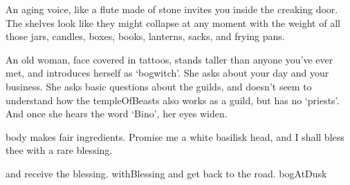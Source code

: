 An aging voice, like a flute made of stone invites you inside the creaking door.
The shelves look like they might collapse at any moment with the weight of all those jars, candles, boxes, books, lanterns, sacks, and frying pans.

An old woman, face covered in tattoos, stands taller than anyone you've ever met, and introduces herself as `\gls{bogwitch}'.
She asks about your day and your business.
She asks basic questions about the guilds, and doesn't seem to understand how the \gls{templeOfBeasts} also works as a guild, but has no `priests'.
And once she hears the word `Bino', her eyes widen.

\begin{speechtext}
   body makes fair \glspl{ingredient}.
  Promise me a white \gls{basilisk} head, and I shall bless thee with a rare blessing.
\end{speechtext}

\begin{selectPath}
  {and receive the blessing.}%
  {withBlessing}
  {and get back to the road.}%
  {bogAtDusk}
\end{selectPath}
